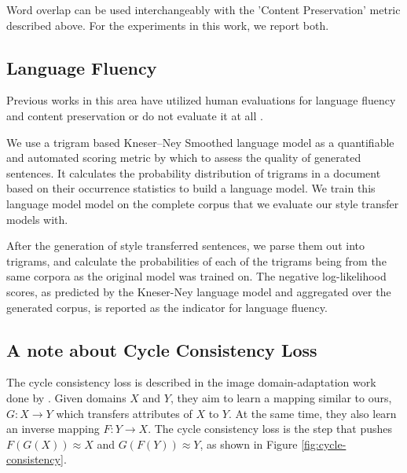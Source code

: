 Word overlap can be used interchangeably with the 'Content Preservation' metric described above. For the experiments in this work, we report both.


\subsection{Language Fluency}

Previous works in this area have utilized human evaluations \citep{shen2017style,fu2017style} for language fluency and content preservation or do not evaluate it at all \cite{hu2017toward}.

We use a trigram based Kneser–Ney Smoothed language model \citep{kneser1995improved} as a quantifiable and automated scoring metric by which to assess the quality of generated sentences. It calculates the probability distribution of trigrams in a document based on their occurrence statistics to build a language model. We train this language model model on the complete corpus that we evaluate our style transfer models with.

After the generation of style transferred sentences, we parse them out into trigrams, and calculate the probabilities of each of the trigrams being from the same corpora as the original model was trained on. The negative log-likelihood scores, as predicted by the Kneser-Ney language model and aggregated over the generated corpus, is reported as the indicator for language fluency.


\subsection{A note about Cycle Consistency Loss}

The cycle consistency loss is described in the image domain-adaptation work done by \cite{zhu2017unpaired}. Given domains $X$ and $Y$, they aim to learn a mapping similar to ours, $G: X \rightarrow Y$ which transfers attributes of $X$ to $Y$. At the same time, they also learn an inverse mapping $F: Y \rightarrow X$. The cycle consistency loss is the step that pushes $F(G(X)) \approx X$ and $G(F(Y)) \approx Y$, as shown in Figure \ref{fig:cycle-consistency}.

